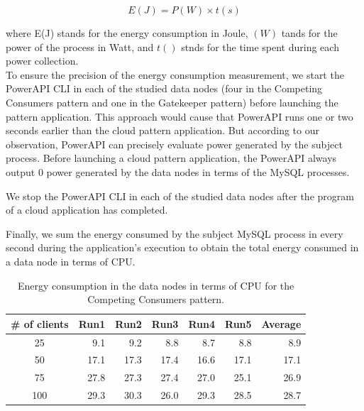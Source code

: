 \documentclass{article}
\begin{document}
\begin{equation} \label{eq:energy}
E(J) = P(W) \times t(s)
\end{equation}

where E(J) stands for the energy consumption in Joule, $(W)$ tands for the power of the process in Watt, and $t()$ stnds for the time spent during each power collection.\\

To ensure the precision of the energy consumption measurement, we start the PowerAPI CLI in each of the studied data nodes (four in the Competing Consumers pattern and one in the Gatekeeper pattern) before launching the pattern application. This approach would cause that PowerAPI runs one or two seconds earlier than the cloud pattern application. But according to our observation, PowerAPI can precisely evaluate power generated by the subject process. Before launching a cloud pattern application, the PowerAPI always output 0 power generated by the data nodes in terms of the MySQL processes.

We stop the PowerAPI CLI in each of the studied data nodes after the program of a cloud application has completed.

Finally, we sum the energy consumed by the subject MySQL process in every second during the application's execution to obtain the total energy consumed in a data node in terms of CPU.


\begin{table}[t]
    \centering
    \caption{Energy consumption in the data nodes in terms of CPU for the Competing Consumers pattern.}
    \label{tab:ccp_energy}
    \begin{tabular}{|c|r|r|r|r|r|r|}
        \hline
        \textbf{\# of clients} & \textbf{Run1} & \textbf{Run2} & \textbf{Run3} & \textbf{Run4} & \textbf{Run5} & \textbf{Average}\\ \hline
        25 & 9.1 & 9.2 & 8.8 & 8.7 & 8.8 & 8.9 \\ \hline 
        50 & 17.1 & 17.3 & 17.4 & 16.6 & 17.1 & 17.1 \\ \hline
        75 & 27.8 & 27.3 & 27.4 & 27.0 & 25.1 & 26.9 \\ \hline
        100 & 29.3 & 30.3 & 26.0 & 29.3 & 28.5 & 28.7 \\ \hline
	\end{tabular}
\end{table}
\end{document}
